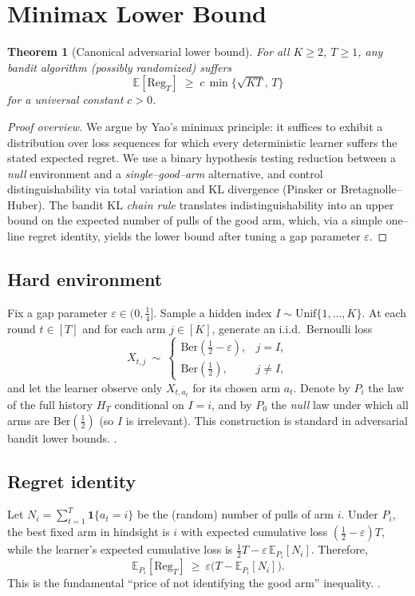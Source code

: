 \documentclass[10pt,twocolumn]{article}
\newcommand{\E}{\mathbb{E}}
\newcommand{\Reg}{\mathrm{Reg}}
\newcommand{\Ber}{\mathrm{Ber}}
\newtheorem{theorem}{Theorem}
\theoremstyle{definition}
\theoremstyle{remark}
\begin{document}
\section{Minimax Lower Bound}
\label{sec:lowerbound}

\begin{theorem}[Canonical adversarial lower bound]
  For all $K\ge2$, $T\ge1$, any bandit algorithm (possibly randomized) suffers
  \[
    \E[\Reg_T]\;\ge\; c\,\min\{\sqrt{KT},\,T\}
  \]
  for a universal constant $c>0$.
\end{theorem}

\begin{proof}[Proof overview]
  We argue by Yao’s minimax principle: it suffices to exhibit a distribution over loss sequences for which every deterministic learner suffers the stated expected regret. We use a binary hypothesis testing reduction between a \emph{null} environment and a \emph{single–good–arm} alternative, and control distinguishability via total variation and KL divergence (Pinsker or Bretagnolle–Huber). The bandit KL \emph{chain rule} translates indistinguishability into an upper bound on the expected number of pulls of the good arm, which, via a simple one–line regret identity, yields the lower bound after tuning a gap parameter $\varepsilon$.
\end{proof}

\subsection{Hard environment}
\label{subsec:hard-env}
Fix a gap parameter $\varepsilon\in(0,\tfrac14]$. Sample a hidden index $I\sim\mathrm{Unif}\{1,\dots,K\}$. At each round $t\in[T]$ and for each arm $j\in[K]$, generate an i.i.d.\ Bernoulli loss
\[
  X_{t,j}\ \sim\
  \begin{cases}
    \Ber(\tfrac12-\varepsilon), & j=I,     \\
    \Ber(\tfrac12),             & j\neq I,
  \end{cases}
\]
and let the learner observe only $X_{t,a_t}$ for its chosen arm $a_t$. Denote by $P_i$ the law of the full history $H_T$ conditional on $I=i$, and by $P_0$ the \emph{null} law under which all arms are $\Ber(\tfrac12)$ (so $I$ is irrelevant). This construction is standard in adversarial bandit lower bounds. \citep[Ch.~15]{LS20} \citep{Auer2002Nonstochastic}.

\subsection{Regret identity}
\label{subsec:regret-identity}
Let $N_i=\sum_{t=1}^T \mathbf{1}\{a_t=i\}$ be the (random) number of pulls of arm $i$. Under $P_i$, the best fixed arm in hindsight is $i$ with expected cumulative loss $(\tfrac12-\varepsilon)T$, while the learner’s expected cumulative loss is $\tfrac12 T-\varepsilon\,\E_{P_i}[N_i]$. Therefore,
\begin{equation}
  \E_{P_i}[\Reg_T]\ \ge\ \varepsilon\Big(T-\E_{P_i}[N_i]\Big).
  \label{eq:regret-identity}
\end{equation}
This is the fundamental “price of not identifying the good arm” inequality. \citep[Sec.~15.2]{LS20}.
\end{document}
